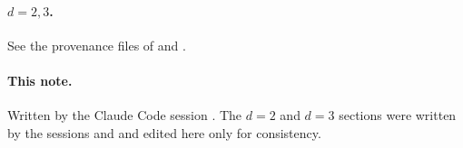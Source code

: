 \paragraph{$d=2,3$.} See the provenance files of  and .

\paragraph{This note.} Written by the Claude Code session . The $d=2$ and $d=3$ sections were written by
the sessions  and  and edited here only for consistency.

